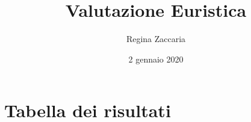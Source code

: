 \documentclass[french]{article}
\title{Valutazione Euristica}
\author{Regina Zaccaria}
\date{2 gennaio 2020}
\begin{document}
\maketitle

\section{Tabella dei risultati}




\end{document}
